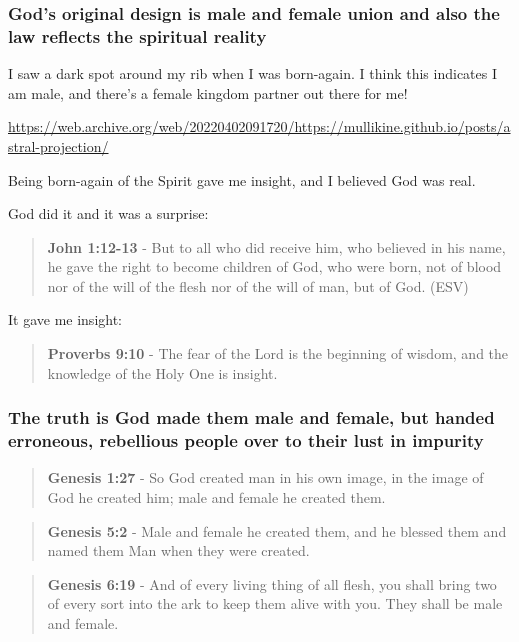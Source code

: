 \documentclass[11pt]{article}
\begin{document}
\subsubsection{God's original design is male and female union and also the law reflects the spiritual reality}
\label{sec:orgdfe7973}

I saw a dark spot around my rib when I was born-again.
I think this indicates I am male, and there's a female kingdom partner out there for me!

\url{https://web.archive.org/web/20220402091720/https://mullikine.github.io/posts/astral-projection/}

Being born-again of the Spirit gave me insight, and I believed God was real.

God did it and it was a surprise:

\begin{quote}
\textbf{John 1:12-13} - But to all who did receive him, who believed in his name, he gave the right to become children of God, who were born, not of blood nor of the will of the flesh nor of the will of man, but of God. (ESV)
\end{quote}

It gave me insight:

\begin{quote}
\textbf{Proverbs 9:10} - The fear of the Lord is the beginning of wisdom, and the knowledge of the Holy One is insight.
\end{quote}

\subsubsection{The truth is God made them male and female, but handed erroneous, rebellious people over to their lust in impurity}
\label{sec:org852f36f}
\begin{quote}
\textbf{Genesis 1:27} - So God created man in his own image, in the image of God he created him; male and female he created them.
\end{quote}

\begin{quote}
\textbf{Genesis 5:2} - Male and female he created them, and he blessed them and named them Man when they were created.
\end{quote}

\begin{quote}
\textbf{Genesis 6:19} - And of every living thing of all flesh, you shall bring two of every sort into the ark to keep them alive with you. They shall be male and female.
\end{quote}
\end{document}
